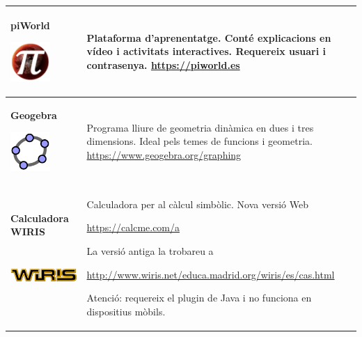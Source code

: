 \begin{center}
	\renewcommand{\arraystretch}{1.5}
\begin{longtable}[h]{>{\raggedleft\arraybackslash}p{}|p{}}
	\hline
	\textbf{piWorld}
	
	\includegraphics[height=1.5cm]{img-00/piworld}
	 & Plataforma d'aprenentatge. Conté explicacions en vídeo i activitats interactives. Requereix usuari i contrasenya. \newline
	\href{https://piworld.es}{\href{https://piworld.es}{https://piworld.es}}
	\\ \hline
 	\textbf{Geogebra} 
 	
 	\includegraphics[height=1.5cm]{img-00/geogebra}
 	& Programa lliure de geometria dinàmica en dues i tres dimensions.
 	Ideal pels temes de funcions i geometria.\newline
 	\href{https://www.geogebra.org/download}{\href{https://www.geogebra.org/graphing}{https://www.geogebra.org/graphing}}
 	  \\ \hline
 	  	\textbf{Calculadora WIRIS}
 	 
 	  	
 	  	\includegraphics[height=2cm]{img-00/wiris}
 	  	& Calculadora per al càlcul simbòlic. Nova versió Web \par \href{https://calcme.com/a}{https://calcme.com/a}
 	  	
 	  	La versió antiga la trobareu a \par \href{http://www.wiris.net/educa.madrid.org/wiris/es/cas.html}{http://www.wiris.net/educa.madrid.org/wiris/es/cas.html}
 	  	
 	  	 Atenció: requereix el plugin de Java i no funciona en dispositius mòbils.
 	  \\ \hline
 
 \end{longtable}
\end{center}
 